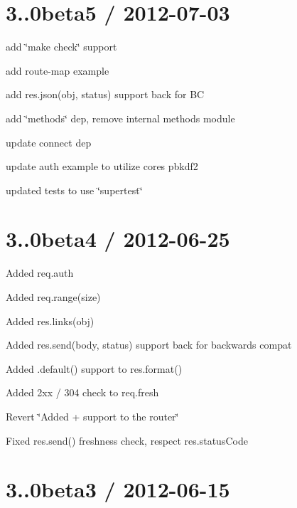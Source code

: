 {\ttfamily \section*{3..\+0beta5 / 2012-\/07-\/03 }}

{\ttfamily }

{\ttfamily 
\begin{DoxyItemize}
\item add \char`\"{}make check\char`\"{} support
\item add route-\/map example
\item add {\ttfamily res.\+json(obj, status)} support back for BC
\item add \char`\"{}methods\char`\"{} dep, remove internal methods module
\item update connect dep
\item update auth example to utilize cores pbkdf2
\item updated tests to use \char`\"{}supertest\char`\"{}
\end{DoxyItemize}}

{\ttfamily \section*{3..\+0beta4 / 2012-\/06-\/25 }}

{\ttfamily }

{\ttfamily 
\begin{DoxyItemize}
\item Added {\ttfamily req.\+auth}
\item Added {\ttfamily req.\+range(size)}
\item Added {\ttfamily res.\+links(obj)}
\item Added {\ttfamily res.\+send(body, status)} support back for backwards compat
\item Added {\ttfamily .default()} support to {\ttfamily res.\+format()}
\item Added 2xx / 304 check to {\ttfamily req.\+fresh}
\item Revert \char`\"{}\+Added + support to the router\char`\"{}
\item Fixed {\ttfamily res.\+send()} freshness check, respect res.\+status\+Code
\end{DoxyItemize}}

{\ttfamily \section*{3..\+0beta3 / 2012-\/06-\/15 }}

